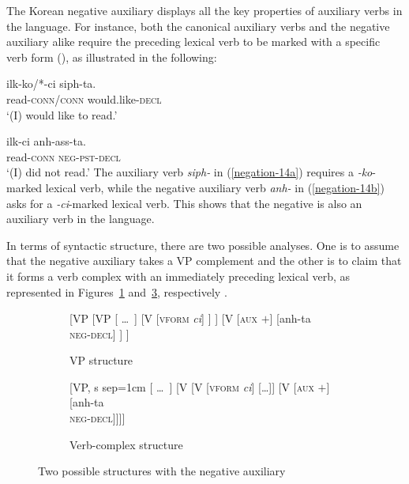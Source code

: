 \documentclass[output=paper
	        ,collection
	        ,collectionchapter
 	        ,biblatex
                ,babelshorthands
                ,newtxmath
                ,draftmode
                ,colorlinks, citecolor=brown
]{langscibook}
\begin{document}
{\begin{exe}
\begin{xlist}
\begin{exe}
\begin{xlist}
%


%
The Korean negative auxiliary displays all the key properties of auxiliary verbs in the language. For instance, both the canonical auxiliary verbs and
the negative auxiliary alike require the preceding lexical verb to be marked with a specific verb form (\vform), as illustrated
in the following:

\eal
\ex\label{negation-14a}
\gll ilk-ko/*-ci siph-ta. \\
     read-\textsc{conn}/\textsc{conn} would.like-\textsc{decl} \\
\glt `(I) would like to read.'

\ex\label{negation-14b}
\gll ilk-ci anh-ass-ta. \\
     read-\textsc{conn} \textsc{neg}-\textsc{pst}-\textsc{decl} \\
\glt `(I) did not read.'
\zl
\noindent
The auxiliary verb \textit{siph-} in (\ref{negation-14a}) requires a
\textit{-ko}-marked lexical verb, while the negative auxiliary
 verb \textit{anh-} in (\ref{negation-14b}) asks for a \textit{-ci}-marked lexical
 verb. This shows that the negative is also an auxiliary verb in the language.

In terms of syntactic structure, there
are two possible analyses.  One is to assume that the negative auxiliary takes a VP complement and the other is to claim that it forms a verb complex with
an immediately preceding lexical verb, as represented in Figures~\ref{negation-fig:3a} and~\ref{negation-fig:3b}, respectively
\citep{Chung98a-u, Kim:16}.
%
\begin{figure}
	\begin{subfigure}[b]{0.48\textwidth}
\centering
		\begin{forest}
			[VP
				[VP
					[ \dots\ ]
					[V {[\textsc{vform} \textit{ci}]}
					]
					]
				[V {[\textsc{aux $+$}]}
					[anh-ta\\ \textsc{neg-decl}]
				]
			]	
		\end{forest}
	\caption{VP structure}\label{negation-fig:3a}
		\end{subfigure}	
\hfill
	\begin{subfigure}[b]{0.48\textwidth}
\centering
		\begin{forest}
			[VP, s sep=1cm
				[ \dots\ ]
				[V
					[V {[\textsc{vform} \textit{ci}]}
						[\dots]]
					[V {[\textsc{aux $+$}]}
						[anh-ta\\ \textsc{neg-decl}]]]]
		\end{forest}
	\caption{Verb-complex structure}\label{negation-fig:3b}	
		\end{subfigure}
	\caption{Two possible structures with the negative auxiliary}
\end{figure}


\end{xlist}
\end{exe}
\end{xlist}
\end{exe}}
\end{document}
